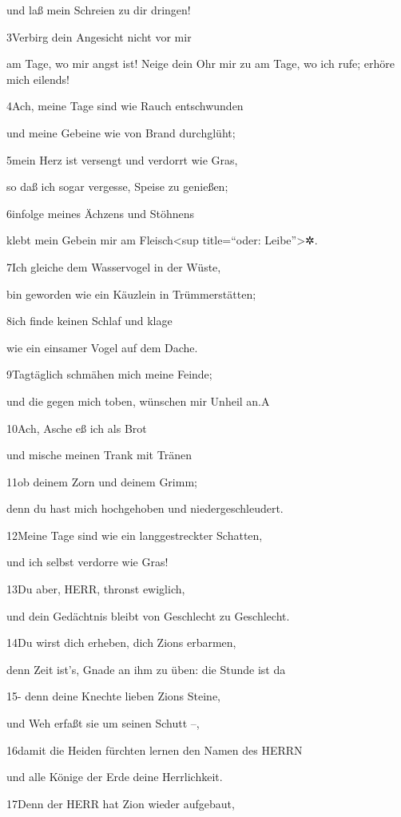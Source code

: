 und laß mein Schreien zu dir dringen!

3Verbirg dein Angesicht nicht vor mir

am Tage, wo mir angst ist! Neige dein Ohr mir zu am Tage, wo ich rufe;
erhöre mich eilends!

4Ach, meine Tage sind wie Rauch entschwunden

und meine Gebeine wie von Brand durchglüht;

5mein Herz ist versengt und verdorrt wie Gras,

so daß ich sogar vergesse, Speise zu genießen;

6infolge meines Ächzens und Stöhnens

klebt mein Gebein mir am Fleisch\textless sup title=``oder:
Leibe''\textgreater✲.

7Ich gleiche dem Wasservogel in der Wüste,

bin geworden wie ein Käuzlein in Trümmerstätten;

8ich finde keinen Schlaf und klage

wie ein einsamer Vogel auf dem Dache.

9Tagtäglich schmähen mich meine Feinde;

und die gegen mich toben, wünschen mir Unheil an.{A}

10Ach, Asche eß ich als Brot

und mische meinen Trank mit Tränen

11ob deinem Zorn und deinem Grimm;

denn du hast mich hochgehoben und niedergeschleudert.

12Meine Tage sind wie ein langgestreckter Schatten,

und ich selbst verdorre wie Gras!

13Du aber, HERR, thronst ewiglich,

und dein Gedächtnis bleibt von Geschlecht zu Geschlecht.

14Du wirst dich erheben, dich Zions erbarmen,

denn Zeit ist's, Gnade an ihm zu üben: die Stunde ist da

15- denn deine Knechte lieben Zions Steine,

und Weh erfaßt sie um seinen Schutt --,

16damit die Heiden fürchten lernen den Namen des HERRN

und alle Könige der Erde deine Herrlichkeit.

17Denn der HERR hat Zion wieder aufgebaut,

